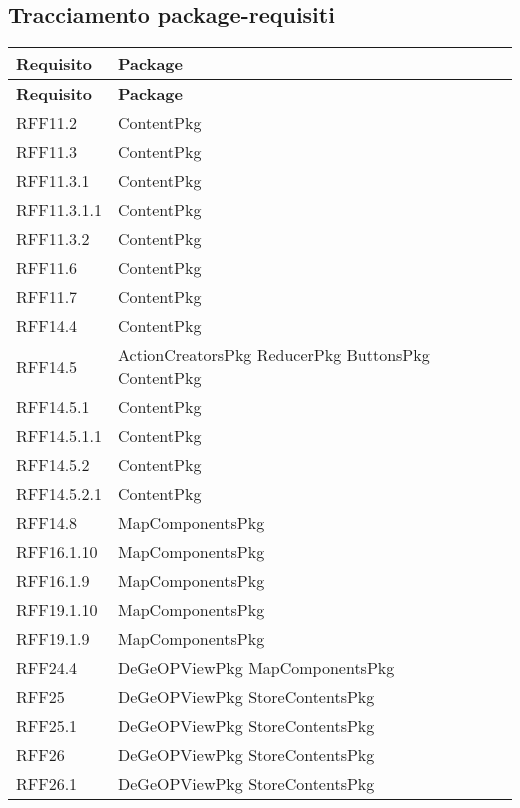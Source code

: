	\subsection{Tracciamento package-requisiti}	
	\def\arraystretch{1.5}
	\begin{longtable}{p{2.5cm}!{\VRule[1pt]}p{5cm}}
		\color{white} \textbf{Requisito} & \color{white} \textbf{Package} \\ 
		\endfirsthead
		\color{white} \textbf{Requisito} & \color{white} \textbf{Package} \\ 
		\endhead
		RFF11.2 & ContentPkg\\
		RFF11.3 & ContentPkg\\
		RFF11.3.1 & ContentPkg\\
		RFF11.3.1.1 & ContentPkg\\
		RFF11.3.2 & ContentPkg\\
		RFF11.6 & ContentPkg\\
		RFF11.7 & ContentPkg\\
		RFF14.4 & ContentPkg\\
		RFF14.5 & ActionCreatorsPkg \newline ReducerPkg \newline ButtonsPkg \newline ContentPkg\\
		RFF14.5.1 & ContentPkg\\
		RFF14.5.1.1 & ContentPkg\\
		RFF14.5.2 & ContentPkg\\
		RFF14.5.2.1 & ContentPkg\\
		RFF14.8 & MapComponentsPkg\\
		RFF16.1.10 & MapComponentsPkg\\
		RFF16.1.9 & MapComponentsPkg\\
		RFF19.1.10 & MapComponentsPkg\\
		RFF19.1.9 & MapComponentsPkg\\
		RFF24.4 & DeGeOPViewPkg \newline MapComponentsPkg\\
		RFF25 & DeGeOPViewPkg \newline StoreContentsPkg\\
		RFF25.1 & DeGeOPViewPkg \newline StoreContentsPkg\\
		RFF26 & DeGeOPViewPkg \newline StoreContentsPkg\\
		RFF26.1 & DeGeOPViewPkg \newline StoreContentsPkg\\

\end{longtable}
